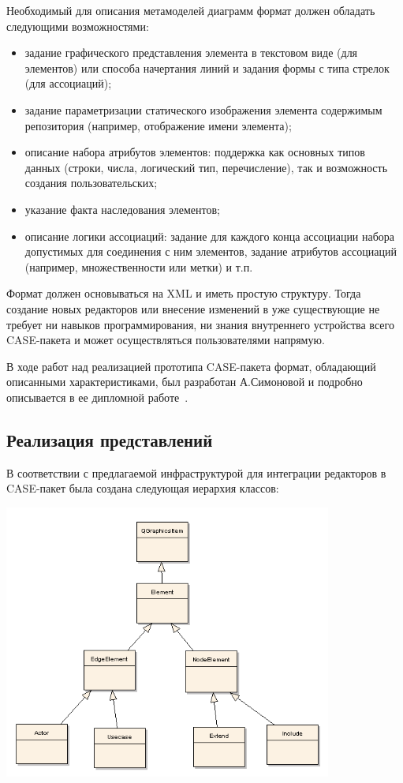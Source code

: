 \documentclass[a5paper]{article}
\begin{document}
Необходимый для описания метамоделей диаграмм формат должен обладать
следующими возможностями:

\begin{itemize}
  \item задание графического представления элемента в текстовом виде (для
	элементов) или способа начертания линий и задания формы с типа стрелок
	(для ассоциаций);
  \item задание параметризации статического изображения элемента содержимым
	репозитория (например, отображение имени элемента);
  \item описание набора атрибутов элементов: поддержка как основных типов данных
	(строки, числа, логический тип, перечисление), так и возможность
	создания пользовательских;
  \item указание факта наследования элементов;
  \item описание логики ассоциаций: задание для каждого конца ассоциации набора
	допустимых для соединения с ним элементов, задание атрибутов ассоциаций
	(например, множественности или метки) и т.п.
\end{itemize}

Формат должен основываться на XML и иметь
простую структуру. Тогда создание новых редакторов или внесение
изменений в уже существующие не требует ни навыков программирования, ни
знания внутреннего устройства всего CASE-пакета и может осуществляться
пользователями напрямую.

В ходе работ над реализацией прототипа CASE-пакета формат, обладающий описанными
характеристиками, был разработан А.Симоновой и подробно описывается в
ее дипломной работе~\cite{simonova}.

\subsection{Реализация представлений}

В соответствии с предлагаемой инфраструктурой для интеграции редакторов
в CASE-пакет была создана следующая иерархия классов:

{
\includegraphics[width=10.786cm,height=9.038cm]{draft04-img2.png} \par}
\end{document}

